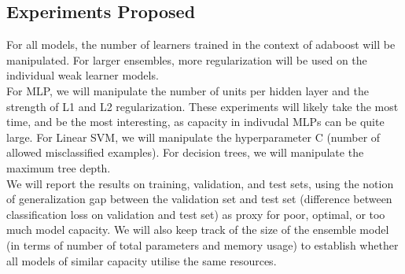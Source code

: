 \documentclass[reqno]{amsart}
\theoremstyle{definition}
\theoremstyle{remark}
\numberwithin{equation}{section}
\begin{document}
\subsection{Experiments Proposed}
For all models, the number of learners trained in the context of adaboost will
be manipulated. For larger ensembles, more regularization will be used on the
individual weak learner models. \\

For MLP, we will manipulate the number of units per hidden layer and the
strength of L1 and L2 regularization. These experiments will likely take the
most time, and be the most interesting, as capacity in indivudal MLPs can be
quite large. For Linear SVM, we will manipulate the hyperparameter C (number of
allowed misclassified examples). For decision trees, we will manipulate the
 maximum tree depth. \\

We will report the results on training, validation, and test sets, using the
notion of generalization gap between the validation set and test set
(difference between classification loss on validation and test set) as proxy for
poor, optimal, or too much model capacity. We will also keep track of the size
of the ensemble model (in terms of number of total parameters and memory usage)
to establish whether all models of similar capacity utilise the same resources. \\
\end{document}
